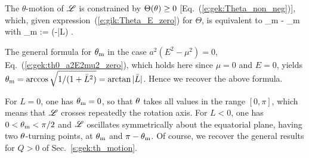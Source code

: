 The $\theta$-motion of $\mathscr{L}$ is constrained by $\Theta(\theta) \geq 0$ [Eq.~(\ref{e:gek:Theta_non_neg})],
which, given expression~(\ref{e:gik:Theta_E_zero}) for $\Theta$, is
equivalent to
\be
    \th_{\rm m} \leq \th \leq \pi - \th_{\rm m} \quad\mbox{with}\quad
    \th_{\rm m} := \arctan (-\bar{L}) .
\ee
\begin{remark}
The general formula for $\theta_{\rm m}$ in the case
$a^2(E^2 - \mu^2) = 0$, Eq.~(\ref{e:gek:th0_a2E2mu2_zero}), which holds here since $\mu=0$ and $E=0$,
yields $\theta_{\rm m} = \arccos\sqrt{1/(1+ \bar{L}^2)} = \arctan | \bar{L} |$.
Hence we recover the above formula.
\end{remark}
For $L = 0$, one has $\theta_{\rm m} = 0$, so that $\theta$ takes all values in the
range $[0,\pi]$, which means that $\mathscr{L}$
crosses repeatedly the rotation axis. For $L< 0$, one has $0 < \theta_{\rm m} < \pi/2$ and
$\mathscr{L}$ oscillates symmetrically about the equatorial plane,
having two $\theta$-turning points, at $\theta_{\rm m} $ and $\pi-\theta_{\rm m}$. Of course, we
recover the general results for $Q>0$ of Sec.~\ref{s:gek:th_motion}.

